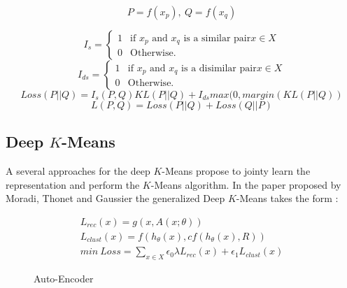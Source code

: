 \begin{equation*}
  P = f(x_p), ~ Q = f(x_q)
\end{equation*}

\begin{equation*}
  I_s = \left\{
\begin{array}{ll}
  1 & \mbox{if $x_p$ and $x_q$ is a similar pair} x \in X\\
  0 & \mbox{Otherwise.}
\end{array}
\right.
\end{equation*}
%
\begin{equation*}
  I_{ds} = \left\{
\begin{array}{ll}
  1 & \mbox{if $x_p$ and $x_q$ is a disimilar pair} x \in X\\
  0 & \mbox{Otherwise.}
\end{array}
\right.
\end{equation*}
\begin{equation*}
  Loss(P || Q) = I_s(P,Q)KL(P || Q) + I_{ds}max(0, margin(KL(P || Q))
\end{equation*}
\begin{equation*}
  L(P,Q) = Loss(P || Q) + Loss(Q || P)
\end{equation*}
\subsection{Deep $K$-Means}
A several approaches for the deep $K$-Means propose to jointy learn the
representation and perform the $K$-Means algorithm. 
In the paper proposed by Moradi, Thonet and Gaussier \cite{Deap-K-Means} the
generalized Deep $K$-Means takes the form :

\begin{gather*}
  L_{rec}(x) = g(x, A(x; \theta)) \\
  L_{clust}(x) = f(h_\theta(x), cf(h_\theta(x), R))\\
  min~Loss = \sum_{x \in X} \epsilon_0\lambda L_{rec}(x) + \epsilon_1 L_{clust}
  (x)
\end{gather*}
\begin{figure}[!h]
  \centering
  
  \caption{Auto-Encoder}
  \label{fig:AE}
\end{figure}